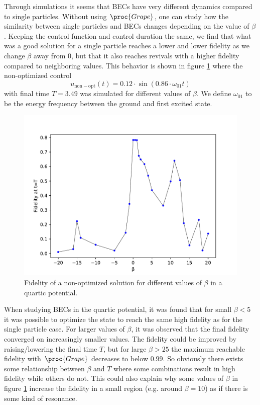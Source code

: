 \documentclass[aps,pra,reprint,superscriptaddress]{revtex4-1}
\begin{document}
Through simulations it seems that BECs have very different dynamics compared to single particles. Without using $\proc{Grape}$, one can study how the similarity between single particles and BECs changes depending on the value of $\beta$. Keeping the control function and control duration the same, we find that what was a good solution for a single particle reaches a lower and lower fidelity as we change $\beta$ away from 0, but that it also reaches revivals with a higher fidelity compared to neighboring values. This behavior is shown in figure \ref{fig:beta} where the non-optimized control 
\begin{equation}
	u_{\mathrm{non-opt}}(t)=0.12\cdot\sin(0.86\cdot \omega_{01} t)
\end{equation} with final time $T=3.49$ was simulated for different values of $\beta$. We define $\omega_{01}$ to be the energy frequency between the ground and first excited state.

\begin{figure}[h]
	\includegraphics[width=\columnwidth]{graphics/beta.pdf}
	\caption{Fidelity of a non-optimized solution for different values of $\beta$ in a quartic potential.}
	\label{fig:beta}
\end{figure}

When studying BECs in the quartic potential, it was found that for small $\beta<5$ it was possible to optimize the state to reach the same high fidelity as for the single particle case. For larger values of $\beta$, it was observed that the final fidelity converged on increasingly smaller values. The fidelity could be improved by raising/lowering the final time $T$, but for large $\beta > 25$ the maximum reachable fidelity with $\proc{Grape}$ decreases to below $0.99$. So obviously there exists some relationship between $\beta$ and $T$ where some combinations result in high fidelity while others do not. This could also explain why some values of $\beta$ in figure \ref{fig:beta} increase the fidelity in a small region (e.g. around $\beta=10$) as if there is some kind of resonance. \\
\end{document}
